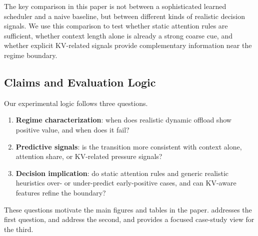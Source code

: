 The key comparison in this paper is not between a sophisticated learned scheduler and a naive baseline, but between different kinds of realistic decision signals. We use this comparison to test whether static attention rules are sufficient, whether context length alone is already a strong coarse cue, and whether explicit KV-related signals provide complementary information near the regime boundary.

\subsection{Claims and Evaluation Logic}

Our experimental logic follows three questions.
\begin{enumerate}
\item \textbf{Regime characterization}: when does realistic dynamic offload show positive value, and when does it fail?
\item \textbf{Predictive signals}: is the transition more consistent with context alone, attention share, or KV-related pressure signals?
\item \textbf{Decision implication}: do static attention rules and generic realistic heuristics over- or under-predict early-positive cases, and can KV-aware features refine the boundary?
\end{enumerate}

These questions motivate the main figures and tables in the paper.  addresses the first question,  and  address the second, and  provides a focused case-study view for the third.
